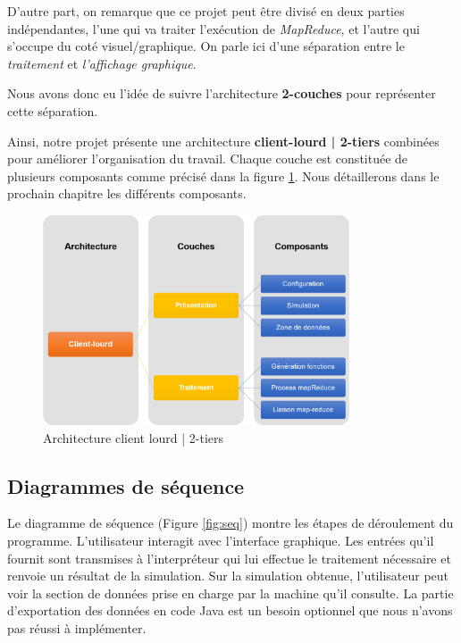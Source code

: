 D'autre part, on remarque que ce projet peut être divisé en deux parties indépendantes, l'une qui va traiter l'exécution de {\it MapReduce}, et l'autre qui s'occupe du coté visuel/graphique. On parle ici d'une séparation entre le {\it traitement} et {\it l'affichage graphique}.

Nous avons donc eu l'idée de suivre l'architecture {\bf 2-couches} pour représenter cette séparation.

Ainsi, notre projet présente une architecture {\bf client-lourd | 2-tiers} combinées pour améliorer l'organisation du travail. Chaque couche est constituée de plusieurs composants comme précisé dans la figure \ref{fig:clientlourd}. Nous détaillerons dans le prochain chapitre les différents composants.

 \begin{figure}[H]
  \centering
    \includegraphics[width=0.81\textwidth]{images/clientlourd.png}
        \caption{Architecture client lourd | 2-tiers}
        \label{fig:clientlourd}
\end{figure}
\newpage
\subsection{Diagrammes de séquence} 

Le diagramme de séquence (Figure \ref{fig:seq}) montre les étapes de déroulement du programme. L'utilisateur interagit avec l'interface graphique. Les entrées qu'il fournit sont transmises à l'interpréteur qui lui effectue le traitement nécessaire et renvoie un résultat de la simulation. Sur la simulation obtenue, l'utilisateur peut voir la section de données prise en charge par la machine qu'il consulte. La partie d'exportation des données en code Java est un besoin optionnel que nous n'avons pas réussi à implémenter.


